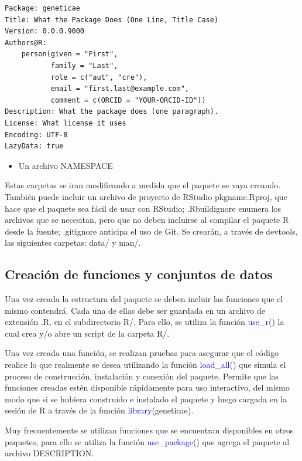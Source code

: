 \begin{verbatim}
Package: geneticae
Title: What the Package Does (One Line, Title Case)
Version: 0.0.0.9000
Authors@R: 
    person(given = "First",
           family = "Last",
           role = c("aut", "cre"),
           email = "first.last@example.com",
           comment = c(ORCID = "YOUR-ORCID-ID"))
Description: What the package does (one paragraph).
License: What license it uses
Encoding: UTF-8
LazyData: true
\end{verbatim}




\begin{itemize}
\item Un archivo NAMESPACE
\end{itemize}

Estas carpetas se iran modificando a medida que el paquete se vaya creando. También puede incluir un archivo de proyecto de RStudio pkgname.Rproj, que hace que el paquete sea fácil de usar con RStudio; .Rbuildignore enumera los archivos que se necesitan, pero que no deben incluirse al compilar el paquete R desde la fuente; .gitignore anticipa el uso de Git.
Se crearán, a través de devtools, las siguientes carpetas: data/ y  man/.




\subsection{Creación de funciones y conjuntos de datos}

Una vez creada la estructura del paquete se deben incluir las funciones que el mismo contendrá. Cada una de ellas debe ser guardada en un archivo de extensión .R, en el subdirectorio R/. Para ello, se utiliza la función \textcolor{blue}{use\_r}() la cual crea y/o abre un script de la carpeta R/.

Una vez creada una función, se realizan pruebas para asegurar que el código realice lo que realmente se desea utilizando la función \textcolor{blue}{load\_all}() que simula el proceso de construcción, instalación y conexión del paquete. Permite que las funciones creadas estén disponible rápidamente para uso interactivo, del mismo modo que si se hubiera construido e instalado el paquete y luego cargada en la sesión de R a través de la función \textcolor{blue}{library}(geneticae).

Muy frecuentemente se utilizan funciones que se encuentran disponibles en otros paquetes, para ello se utiliza la función \textcolor{blue}{use\_package}() que agrega el paquete al archivo DESCRIPTION.

